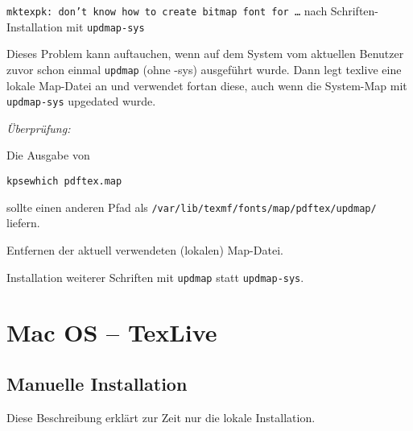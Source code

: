 \begin{knownissue}{
  \texttt{mktexpk: don't know how to create bitmap font for \ldots}\newline
  nach Schriften-Installation mit \lstinline{updmap-sys}}

Dieses Problem kann auftauchen, wenn auf dem System vom aktuellen Benutzer
zuvor schon einmal \lstinline{updmap} (ohne -sys) ausgeführt wurde.
Dann legt texlive eine lokale Map-Datei an und verwendet fortan diese,
auch wenn die System-Map mit \lstinline{updmap-sys} upgedated wurde.

\noindent\textit{Überprüfung:}

Die Ausgabe von
\begin{lstlisting}
kpsewhich pdftex.map
\end{lstlisting}
sollte einen anderen Pfad als
\lstinline{/var/lib/texmf/fonts/map/pdftex/updmap/} liefern.


Entfernen der aktuell verwendeten (lokalen) Map-Datei.


Installation weiterer Schriften mit \lstinline{updmap} statt
\lstinline{updmap-sys}.

\end{knownissue}


\clearpage
\section{Mac OS -- TexLive}

\subsection{Manuelle Installation}

Diese Beschreibung erklärt zur Zeit nur die lokale Installation.

